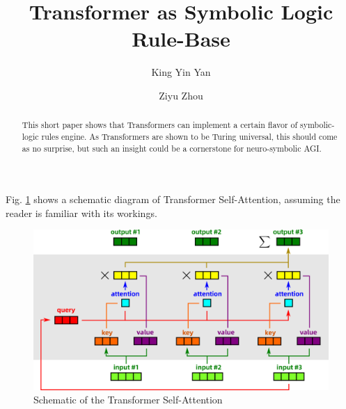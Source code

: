 \documentclass[runningheads]{llncs}
\begin{document}
%
\title{Transformer as Symbolic Logic Rule-Base}
%
%
\author{King Yin Yan \and
Ziyu Zhou}
%
%
%
\maketitle              %
%
\begin{abstract}
This short paper shows that Transformers \cite{Vaswani2017} can implement a certain flavor of symbolic-logic rules engine.  As Transformers are shown to be Turing universal\cite{Perez2021}, this should come as no surprise, but such an insight could be a cornerstone for neuro-symbolic AGI.

\end{abstract}
%
%

Fig. \ref{Self-Attention} shows a schematic diagram of Transformer Self-Attention, assuming the reader is familiar with its workings.
\begin{figure}[H]
	\centering
	\includegraphics[scale=0.6]{Self-Attention.png}
	\caption{Schematic of the Transformer Self-Attention}
	\label{Self-Attention}
\end{figure}
\end{document}
